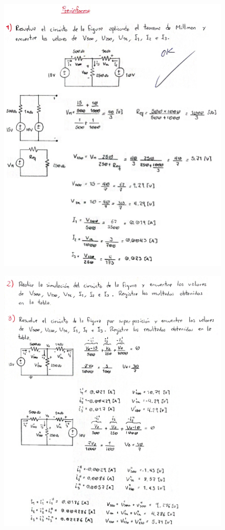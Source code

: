 \documentclass[letter,11pt]{article}
\begin{document}
\vspace{1.0cm}
\begin{figure}[!h]
\centering
\includegraphics[scale=0.18]{resources/preinforme1.eps}
\end{figure}

\newpage

\begin{figure}[!h]
\centering
\includegraphics[scale=0.18]{resources/preinforme2.eps}
\end{figure}
\end{document}
